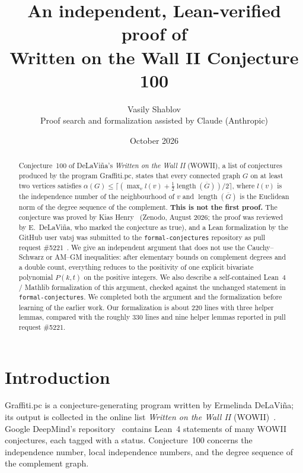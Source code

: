 \documentclass[11pt]{article}
\title{An independent, Lean-verified proof of\\
Written on the Wall II Conjecture 100}
\author{Vasily Shablov\\[2pt]
\small Proof search and formalization assisted by Claude (Anthropic)}
\date{October 2026}
\theoremstyle{definition}
\theoremstyle{remark}
\newcommand{\Gbar}{\overline{G}}
\newcommand{\lng}{\operatorname{length}}
\begin{document}
\maketitle

\begin{abstract}
Conjecture~100 of DeLaVi\~na's \emph{Written on the Wall II} (WOWII), a list of
conjectures produced by the program Graffiti.pc, states that every connected
graph $G$ on at least two vertices satisfies
$\alpha(G) \le \bigl\lceil (\max_v l(v) + \tfrac12 \lng(\Gbar))/2 \bigr\rceil$, where
$l(v)$ is the independence number of the neighbourhood of $v$ and
$\lng(\Gbar)$ is the Euclidean norm of the degree sequence of the complement.
\textbf{This is not the first proof.} The conjecture was proved by Kias
Henry~\cite{henry} (Zenodo, August 2026; the proof was reviewed by
E.~DeLaVi\~na, who marked the conjecture as true), and a Lean formalization by
the GitHub user vatsj was submitted to the \texttt{formal-conjectures}
repository as pull request \#5221~\cite{vatsj}. We give an independent
argument that does not use the Cauchy--Schwarz or AM--GM inequalities: after
elementary bounds on complement degrees and a double count, everything reduces
to the positivity of one explicit bivariate polynomial
$P(k,t)$ on the positive integers. We also describe a self-contained Lean~4 /
Mathlib formalization of this argument, checked against the unchanged
statement in \texttt{formal-conjectures}. We completed both the argument and the
formalization before learning of the earlier work. Our formalization is about
220 lines with three helper lemmas, compared with the roughly 330 lines and
nine helper lemmas reported in pull request \#5221.
\end{abstract}

\section{Introduction}

Graffiti.pc is a conjecture-generating program written by Ermelinda
DeLaVi\~na; its output is collected in the online list \emph{Written on the
Wall II} (WOWII)~\cite{wowii}. Google DeepMind's 
repository~\cite{fc} contains Lean~4 statements of many WOWII conjectures,
each tagged with a status. Conjecture~100 concerns the independence number,
local independence numbers, and the degree sequence of the complement graph.
\end{document}
